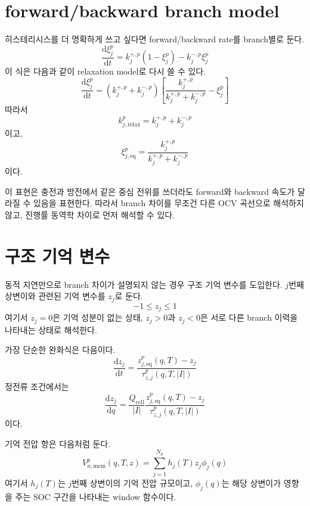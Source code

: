 \documentclass[11pt,a4paper]{article}
\newcommand{\dd}{\mathrm{d}}
\newcommand{\eq}{\mathrm{eq}}
\newcommand{\cell}{\mathrm{cell}}
\begin{document}
\section{forward/backward branch model}
히스테리시스를 더 명확하게 쓰고 싶다면 forward/backward rate를 branch별로 둔다.
\begin{equation}
\frac{\dd\xi_j^{p}}{\dd t}
=
k_j^{+,p}(1-\xi_j^{p})-k_j^{-,p}\xi_j^{p}
\label{eq:v5_fb_branch}
\end{equation}
이 식은 다음과 같이 relaxation model로 다시 쓸 수 있다.
\begin{equation}
\frac{\dd\xi_j^{p}}{\dd t}
=
\left(k_j^{+,p}+k_j^{-,p}\right)
\left[
\frac{k_j^{+,p}}{k_j^{+,p}+k_j^{-,p}}-
\xi_j^{p}
\right]
\end{equation}
따라서
\begin{equation}
k_{j,\mathrm{relax}}^{p}=k_j^{+,p}+k_j^{-,p}
\end{equation}
이고,
\begin{equation}
\xi_{j,\eq}^{p}=\frac{k_j^{+,p}}{k_j^{+,p}+k_j^{-,p}}
\end{equation}
이다.

이 표현은 충전과 방전에서 같은 중심 전위를 쓰더라도 forward와 backward 속도가 달라질 수 있음을 표현한다. 따라서 branch 차이를 무조건 다른 OCV 곡선으로 해석하지 않고, 진행률 동역학 차이로 먼저 해석할 수 있다.

\section{구조 기억 변수}
동적 지연만으로 branch 차이가 설명되지 않는 경우 구조 기억 변수를 도입한다. \(j\)번째 상변이와 관련된 기억 변수를 \(z_j\)로 둔다.
\begin{equation}
-1\leq z_j\leq 1
\end{equation}
여기서 \(z_j=0\)은 기억 성분이 없는 상태, \(z_j>0\)과 \(z_j<0\)은 서로 다른 branch 이력을 나타내는 상태로 해석한다.

가장 단순한 완화식은 다음이다.
\begin{equation}
\frac{\dd z_j}{\dd t}
=
\frac{z_{j,\eq}^{p}(q,T)-z_j}{\tau_{z,j}^{p}(q,T,|I|)}
\label{eq:v5_z_time}
\end{equation}
정전류 조건에서는
\begin{equation}
\frac{\dd z_j}{\dd q}
=
\frac{Q_{\cell}}{|I|}
\frac{z_{j,\eq}^{p}(q,T)-z_j}{\tau_{z,j}^{p}(q,T,|I|)}
\label{eq:v5_z_q}
\end{equation}
이다.

기억 전압 항은 다음처럼 둔다.
\begin{equation}
V_{n,\mathrm{mem}}^{p}(q,T,z)
=
\sum_{j=1}^{N_p}h_j(T)z_j\phi_j(q)
\label{eq:v5_vmem}
\end{equation}
여기서 \(h_j(T)\)는 \(j\)번째 상변이의 기억 전압 규모이고, \(\phi_j(q)\)는 해당 상변이가 영향을 주는 SOC 구간을 나타내는 window 함수이다.
\end{document}
